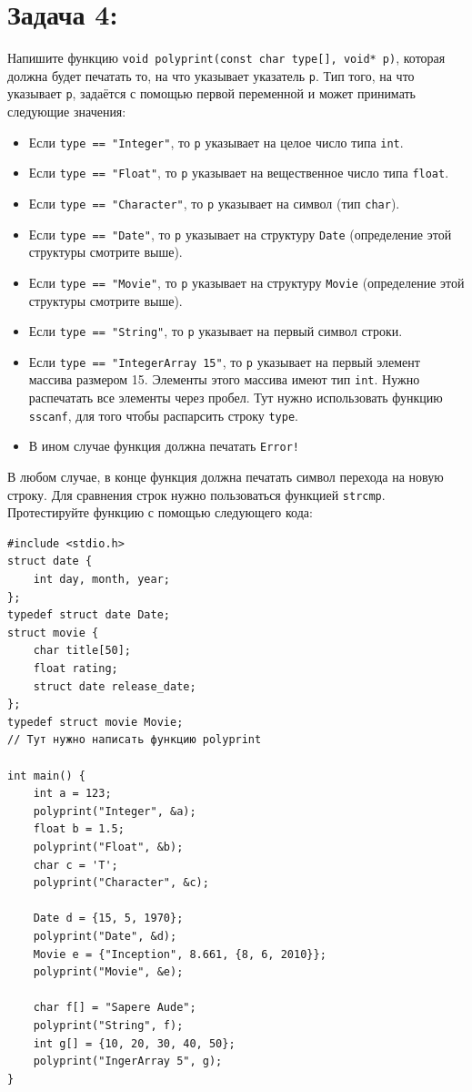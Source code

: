 \documentclass{article}
\begin{document}
\section*{Задача 4:}
Напишите функцию \texttt{void polyprint(const char type[], void* p)}, которая должна будет печатать то, на что указывает указатель \texttt{p}. Тип того, на что указывает \texttt{p}, задаётся с помощью первой переменной и может принимать следующие значения:
\begin{itemize}
\item Если \texttt{type == "Integer"}, то \texttt{p} указывает на целое число типа \texttt{int}.
\item Если \texttt{type == "Float"}, то \texttt{p} указывает на вещественное число типа \texttt{float}.
\item Если \texttt{type == "Character"}, то \texttt{p} указывает на символ (тип \texttt{char}).
\item Если \texttt{type == "Date"}, то \texttt{p} указывает на структуру \texttt{Date} (определение этой структуры смотрите выше).
\item Если \texttt{type == "Movie"}, то \texttt{p} указывает на структуру \texttt{Movie} (определение этой структуры смотрите выше).
\item Если \texttt{type == "String"}, то \texttt{p} указывает на первый символ строки.
\item Если \texttt{type == "IntegerArray 15"}, то \texttt{p} указывает на первый элемент массива размером 15. Элементы этого массива имеют тип \texttt{int}. Нужно распечатать все элементы через пробел. Тут нужно использовать функцию \texttt{sscanf}, для того чтобы распарсить строку \texttt{type}.
\item В ином случае функция должна печатать \texttt{Error!}
\end{itemize}
В любом случае, в конце функция должна печатать символ перехода на новую строку. Для сравнения строк нужно пользоваться функцией \texttt{strcmp}. Протестируйте функцию с помощью следующего кода:

\begin{lstlisting}
#include <stdio.h>
struct date {
    int day, month, year;
};
typedef struct date Date;
struct movie {
    char title[50];
    float rating;
    struct date release_date;
};
typedef struct movie Movie;
// Тут нужно написать функцию polyprint

int main() {
    int a = 123;
    polyprint("Integer", &a);
    float b = 1.5;
    polyprint("Float", &b);
    char c = 'T';
    polyprint("Character", &c);
    
    Date d = {15, 5, 1970};
    polyprint("Date", &d);
    Movie e = {"Inception", 8.661, {8, 6, 2010}};
    polyprint("Movie", &e);
    
    char f[] = "Sapere Aude";
    polyprint("String", f);
    int g[] = {10, 20, 30, 40, 50};
    polyprint("IngerArray 5", g);
}
\end{lstlisting}
\end{document}
